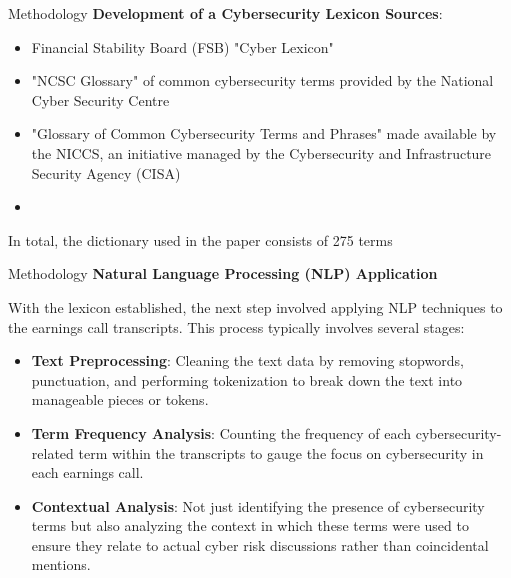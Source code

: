 \documentclass[11pt]{beamer}
\begin{document}
\begin{frame}{Methodology}
\textbf{Development of a Cybersecurity Lexicon Sources}:

	\begin{itemize}
		\item Financial Stability Board (FSB) "Cyber Lexicon"

		\item "NCSC Glossary" of common cybersecurity terms provided by the National Cyber Security Centre

		\item "Glossary of Common Cybersecurity Terms and Phrases" made available by the NICCS, an initiative managed by the Cybersecurity and Infrastructure Security Agency (CISA)

		\item 

	\end{itemize}
In total, the dictionary used in the paper consists of 275 terms
\end{frame}
\begin{frame}{Methodology}
\textbf{Natural Language Processing (NLP) Application}

With the lexicon established, the next step involved applying NLP techniques to the earnings call transcripts. This process typically involves several stages:

	\begin{itemize}
		\item \textbf{Text Preprocessing}: Cleaning the text data by removing stopwords, punctuation, and performing tokenization to break down the text into manageable pieces or tokens.

		\item \textbf{Term Frequency Analysis}: Counting the frequency of each cybersecurity-related term within the transcripts to gauge the focus on cybersecurity in each earnings call.

		\item \textbf{Contextual Analysis}: Not just identifying the presence of cybersecurity terms but also analyzing the context in which these terms were used to ensure they relate to actual cyber risk discussions rather than coincidental mentions.

	\end{itemize}
\end{frame}
\end{document}
